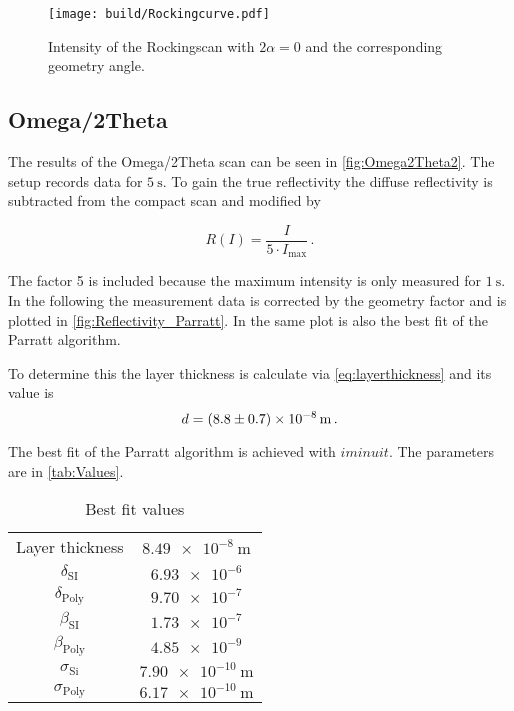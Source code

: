 \begin{figure}[H]
    \centering
    \texttt{[image: build/Rockingcurve.pdf]}
    \caption{Intensity of the Rockingscan with $2\alpha = 0$ and the corresponding geometry angle.} 
    \label{fig:Rockingscan}
\end{figure}

\subsection{Omega/2Theta}

The results of the Omega/2Theta scan can be seen in \autoref{fig:Omega2Theta2}. 
The setup records data for $ \SI{5}{\second}$.
To gain the true reflectivity the diffuse reflectivity is subtracted from the compact scan and modified by

\begin{equation*}
    R(I) =   \frac{I}{5 \cdot I_\text{max}}\,.
\end{equation*}

The factor 5 is included because the maximum intensity is only measured for $\SI{1}{\second}$.
In the following the measurement data is corrected by the geometry factor and is plotted in \autoref{fig:Reflectivity_Parratt}.
In the same plot is also the best fit of the Parratt algorithm.

To determine this the layer thickness is calculate via \autoref{eq:layerthickness} and its value is
\begin{equation*}
    d = \SI{8.8 \pm 0.7e-08}{\meter}\,.
\end{equation*}

The best fit of the Parratt algorithm is achieved with $iminuit$\cite{iminuit}.
The parameters are in \autoref{tab:Values}.


\begin{table}[H]
    \centering
    \caption{Best fit values}
    \label{tab:Values}
    \begin{tabular}{c  c}
    \midrule
          {Layer thickness}         &  $\SI{8.49e-8}{\meter}$  \\    
          {$\delta_{\text{SI}}$}    &  $\num{6.93e-6}$          \\    
          {$\delta_\text{Poly}$}    &  $\num{9.70e-7}$          \\    
          {$\beta_\text{SI}$}        &  $\num{1.73e-7}$          \\    
          {$\beta_\text{Poly}$}     &  $\num{4.85e-9}$          \\    
          {$\sigma_\text{Si}$}      &  $\SI{7.90e-10}{\meter}$  \\    
          {$\sigma_{\text{Poly}}$}   &  $\SI{6.17e-10}{\meter}$  \\    
    \bottomrule
    \end{tabular}
\end{table}


